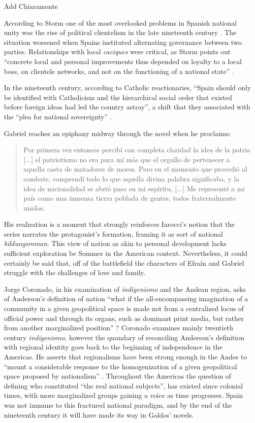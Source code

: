 \documentclass[12pt]{report}
\begin{document}
Add Chiaramonte

According to Storm one of the most overlooked problems in Spanish national unity was the rise of political clientelism in the late nineteenth century \cite[147]{Storm2004}.
The situation worsened when Spains instituted alternating governance between two parties.
Relationships with local \textit{caciques} were critical, as Storm points out \enquote{concrete local and personal improvements thus depended on loyalty to a local boss, on clientele networks, and not on the functioning of a national state} \cite[148]{Storm2004}.

In the nineteenth century, according to Catholic reactionaries, \enquote{Spain should only be identified with Catholicism and the hierarchical social order that existed before foreign ideas had led the country astray}, a shift that they associated with the \enquote{plea for national sovereignty} \cite[149]{Storm2004}.


Gabriel reaches an epiphany midway through the novel when he proclaims:
\blockquote[{\cite[1127]{Galdos1882}}]{Por primera vez entonces percibí con completa claridad la idea de la patria [...] el patriotismo no era para mí más que el orgullo de pertenecer a aquella casta de matadores de moros. Pero en el momento que procedió al combate, comprendí todo lo que aquella divina palabra significaba, y la idea de nacionalidad se abrió paso en mi espíritu, [...] Me representé a mi país como una inmensa tierra poblada de gentes, todos fraternalmente unidos.}
His realization is a moment that strongly reinforces Iarocci's notion that the series narrates the protagonist's formation, framing it as sort of national \textit{bildungsroman}.
This view of nation as akin to personal development lacks sufficient exploration be Sommer in the American context.
Nevertheless, it could certainly be said that, off of the battlefield the characters of Efraín and Gabriel struggle with the challenges of love and family.

Jorge Coronado, in his examination of \textit{indigenismo} and the Andean region, asks of Anderson's definition of nation \enquote{what if the all-encompassing imagination of a community in a given geopolitical space is made not from a centralized locus of official power and through its organs, such as dominant print media, but rather from another marginalized position} \cite[12]{Coronado2009}?
Coronado examines mainly twentieth century \textit{indigenismo}, however the quandary of reconciling Anderson's definition with regional identity goes back to the beginning of independence in the Americas.
He asserts that regionalisms have been strong enough in the Andes to \enquote{mount a considerable response to the homogenization of a given geopolitical space proposed by nationalism} \cite[12]{Coronado2009}.
Throughout the Americas the question of defining who constituted \enquote{the real national subjects}, has existed since colonial times, with more marginalized groups gaining a voice as time progresses.
Spain was not immune to this fractured national paradigm, and by the end of the nineteenth century it will have made its way in Galdos' novels.
\end{document}
